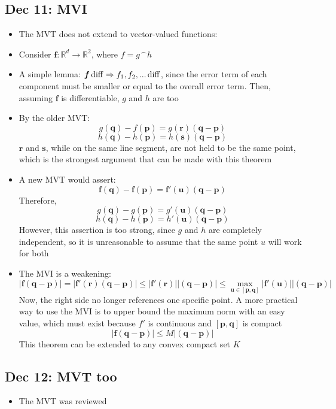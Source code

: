 \documentclass[10pt, oneside]{article}
\let\leq\leqslant
\newcommand{\cat}{^{\,\smallfrown}}
\newcommand{\R}{\mathbb{R}}
\renewcommand{\vec}[1]{\mathbf{#1}}
\newcommand{\vecf}[1]{\boldsymbol{#1}}
\begin{document}
\subsection{Dec 11: MVI}
\begin{itemize}
    \item The MVT does not extend to vector-valued functions:
    \item Consider $\vec{f}: \R^d \rightarrow \R^2$, where $f = g \cat h$
    \item A simple lemma: $\vecf{f} \,{\rm diff} \Rightarrow f_1,f_2,... \,{\rm diff}$, since the error term of each component must be smaller or equal to the overall error term. Then, assuming $\vecf{f}$ is differentiable, $g$ and $h$ are too
    \item By the older MVT:
        \[g(\vec{q}) - f(\vec{p}) = g(\vec{r})(\vec{q} - \vec{p})\]
        \[h(\vec{q}) - h(\vec{p}) = h(\vec{s})(\vec{q} - \vec{p})\]
        $\vec{r}$ and $\vec{s}$, while on the same line segment, are not held to be the same point, which is the strongest argument that can be made with this theorem
    \item A new MVT would assert:
        \[\vecf{f}(\vec{q}) - \vecf{f}(\vec{p}) = \vecf{f}'(\vec{u})(\vec{q} - \vec{p})\]
        Therefore,
        \[g(\vec{q}) - g(\vec{p}) = g'(\vec{u})(\vec{q} - \vec{p})\]
        \[h(\vec{q}) - h(\vec{p}) = h'(\vec{u})(\vec{q} - \vec{p})\]
        However, this assertion is too strong, since $g$ and $h$ are completely independent, so it is unreasonable to assume that the same point $u$ will work for both
    \item The MVI is a weakening:
        \[|\vecf{f}(\vec{q} - \vec{p})| = |\vecf{f}'(\vec{r})(\vec{q} - \vec{p})| \leq |\vecf{f}'(\vec{r})||(\vec{q} - \vec{p})| \leq \max_{\vec{u} \in [\vec{p},\vec{q}]} |\vecf{f}'(\vec{u})||(\vec{q} - \vec{p})|\]
        Now, the right side no longer references one specific point. A more practical way to use the MVI is to upper bound the maximum norm with an easy value, which must exist because $f'$ is continuous and $[\vec{p},\vec{q}]$ is compact
        \[|\vecf{f}(\vec{q} - \vec{p})| \leq M|(\vec{q} - \vec{p})|\]
        This theorem can be extended to any convex compact set $K$
\end{itemize}

\subsection{Dec 12: MVT too}
\begin{itemize}
    \item The MVT was reviewed
\end{itemize}
\end{document}

